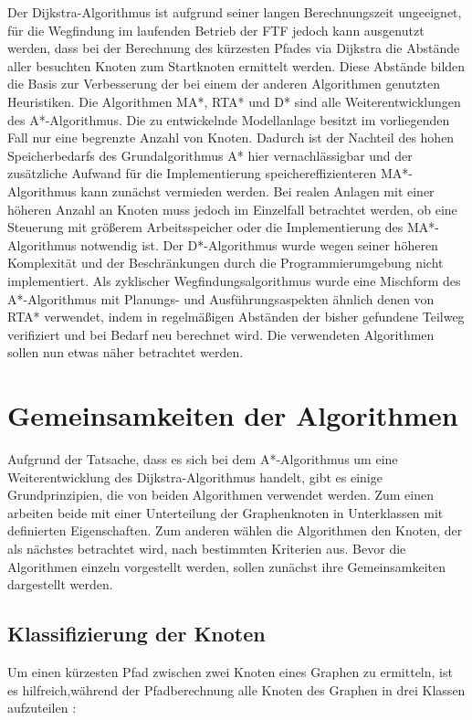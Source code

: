 		Der Dijkstra-Algorithmus ist aufgrund seiner langen Berechnungszeit ungeeignet, für die Wegfindung im laufenden Betrieb der \ac{FTF} jedoch kann ausgenutzt werden, dass bei der Berechnung des kürzesten Pfades via Dijkstra die Abstände aller besuchten Knoten zum Startknoten ermittelt werden. Diese Abstände bilden die Basis zur Verbesserung der bei einem der anderen Algorithmen genutzten Heuristiken. Die Algorithmen \ac{MA*}, \ac{RTA*} und \ac{D*} sind alle Weiterentwicklungen des A*-Algorithmus. Die zu entwickelnde Modellanlage besitzt im vorliegenden Fall nur eine begrenzte Anzahl von Knoten. Dadurch ist der Nachteil des hohen Speicherbedarfs des Grundalgorithmus A* hier vernachlässigbar und der zusätzliche Aufwand für die Implementierung speichereffizienteren \ac{MA*}-Algorithmus kann zunächst vermieden  werden. Bei realen Anlagen mit einer höheren Anzahl an Knoten muss jedoch im Einzelfall betrachtet werden, ob eine Steuerung mit größerem Arbeitsspeicher oder die Implementierung des \ac{MA*}-Algorithmus notwendig ist. Der \ac{D*}-Algorithmus wurde wegen seiner höheren Komplexität und der Beschränkungen durch die Programmierumgebung nicht implementiert. Als zyklischer Wegfindungsalgorithmus wurde eine Mischform des A*-Algorithmus mit Planungs- und Ausführungsaspekten ähnlich denen von \ac{RTA*} verwendet, indem in regelmäßigen Abständen der bisher gefundene Teilweg verifiziert und bei Bedarf neu berechnet wird. Die verwendeten Algorithmen sollen nun etwas näher betrachtet werden.

\section{Gemeinsamkeiten der Algorithmen}

	Aufgrund der Tatsache, dass es sich bei dem A*-Algorithmus um eine Weiterentwicklung des Dijkstra-Algorithmus handelt, gibt es einige Grundprinzipien, die von beiden Algorithmen verwendet werden. Zum einen arbeiten beide mit einer Unterteilung der Graphenknoten in Unterklassen mit definierten Eigenschaften. Zum anderen wählen die Algorithmen den Knoten, der als nächstes betrachtet wird, nach bestimmten Kriterien aus. Bevor die Algorithmen einzeln vorgestellt werden, sollen zunächst ihre Gemeinsamkeiten dargestellt werden.
	
	\subsection{Klassifizierung der Knoten}
		\label{Klassifizierung}
		Um einen kürzesten Pfad zwischen zwei Knoten eines Graphen zu ermitteln, ist es hilfreich,während der Pfadberechnung alle Knoten des Graphen in drei Klassen aufzuteilen \cite{DijkstraAlg}:
		
